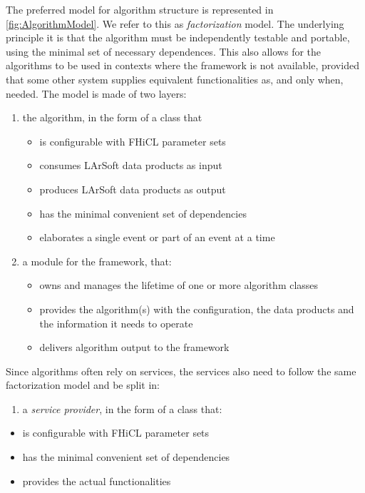 The preferred model for algorithm structure is represented in \cref{fig:AlgorithmModel}.
We refer to this as \emph{factorization} model.
The underlying principle it is that the algorithm must be independently
testable and portable, using the minimal set of necessary dependences.
This also allows for the algorithms to be used in contexts where the
\ART framework is not available,
provided that some other system supplies equivalent functionalities as,
and only when, needed. The model is made of two layers:
\begin{enumerate}
   \item
      the algorithm, in the form of a class that
      \begin{itemize}
         \item
            is configurable with FHiCL parameter sets
         \item
            consumes LArSoft data products as input
         \item
            produces LArSoft data products as output
         \item
            has the minimal convenient set of dependencies
         \item
            elaborates a single event or part of an event at a time
      \end{itemize}
   \item
      a module for the \ART framework, that:
      \begin{itemize}
         \item
           owns and manages the lifetime of one or more algorithm classes
         \item
           provides the algorithm(s) with the configuration, the data products
           and the information it needs to operate
         \item
           delivers algorithm output to the \ART framework
      \end{itemize}
\end{enumerate}

Since algorithms often rely on services, the services also need to
follow the same factorization model and be split in:

\begin{enumerate}
\def\labelenumi{\arabic{enumi}.}
\item
  a \emph{service provider}, in the form of a class that:
\end{enumerate}

\begin{itemize}
\item
  is configurable with FHiCL parameter sets
\item
  has the minimal convenient set of dependencies
\item
  provides the actual functionalities
\end{itemize}

